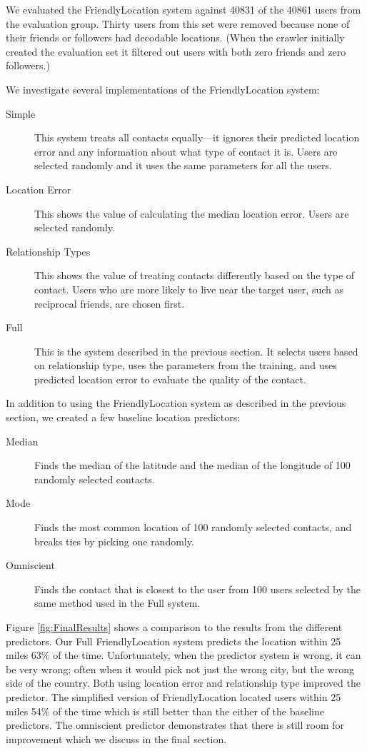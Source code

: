We evaluated the FriendlyLocation system against 40831 of the 40861 users from the evaluation group.
Thirty users from this set were removed because none of their friends or followers had decodable locations.
(When the crawler initially created the evaluation set it filtered out users with both zero friends and zero followers.)

We investigate several implementations of the FriendlyLocation system:
\begin{description}
\item[Simple] This system treats all contacts equally---it ignores their predicted location error and any information about what type of contact it is. Users are selected randomly and it uses the same parameters for all the users.
\item[Location Error] This shows the value of calculating the median location error. Users are selected randomly.
\item[Relationship Types] This shows the value of treating contacts differently
based on the type of contact.
Users who are more likely to live near the target user, such as reciprocal
friends, are chosen first.
\item[Full] This is the system described in the previous section. It selects
users based on relationship type, uses the parameters from the training, and
uses predicted location error to evaluate the quality of the contact.
\end{description}

In addition to using the FriendlyLocation system as described in the previous
section, we created a few baseline location predictors:
\begin{description}
\item[Median] Finds the median of the latitude and the median of the longitude of 100 randomly selected contacts.
\item[Mode] Finds the most common location of 100 randomly selected contacts, and breaks ties by picking one randomly.
\item[Omniscient] Finds the contact that is closest to the user from 100 users selected by the same method used in the Full system.
\end{description}

Figure \ref{fig:FinalResults} shows a comparison to the results from the 
different predictors.
Our Full FriendlyLocation system predicts the location within 25 miles 63\% of
the time.
Unfortunately, when the predictor system is wrong, it can be very wrong; often
when it would pick not just the wrong city, but the wrong side of the
country.
Both using location error and relationship type improved the predictor.  The
simplified version of FriendlyLocation located users within 25 miles 54\% of
the time which is still better than the either of the baseline predictors.
The omniscient predictor demonstrates that there is still room for improvement
which we discuss in the final section.

